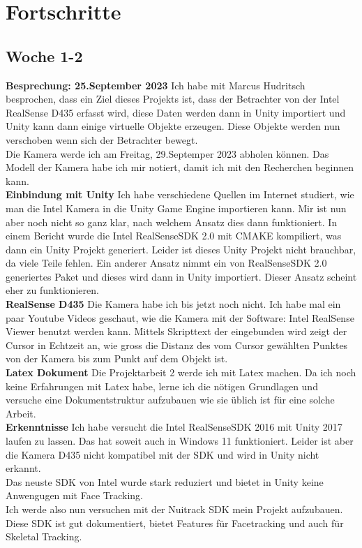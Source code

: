 \section{Fortschritte}
\subsection{Woche 1-2}
\textbf{Besprechung: 25.September 2023}
Ich habe mit Marcus Hudritsch besprochen, dass ein Ziel dieses Projekts ist, dass der Betrachter von der Intel RealSense D435 erfasst wird, diese Daten werden dann in Unity importiert und Unity kann dann einige virtuelle Objekte erzeugen. Diese Objekte werden nun verschoben wenn sich der Betrachter bewegt.\\
Die Kamera werde ich am Freitag, 29.Septemper 2023 abholen k\"onnen. Das Modell der Kamera habe ich mir notiert, damit ich mit den Recherchen beginnen kann.\\
\textbf{Einbindung mit Unity}
Ich habe verschiedene Quellen im Internet studiert, wie man die Intel Kamera in die Unity Game Engine importieren kann. Mir ist nun aber noch nicht so ganz klar, nach welchem Ansatz dies dann funktioniert. In einem Bericht wurde die Intel RealSenseSDK 2.0 mit CMAKE kompiliert, was dann ein Unity Projekt generiert. Leider ist dieses Unity Projekt nicht brauchbar, da viele Teile fehlen. Ein anderer Ansatz nimmt ein von RealSenseSDK 2.0 generiertes Paket und dieses wird dann in Unity importiert. Dieser Ansatz scheint eher zu funktionieren.\\
\textbf{RealSense D435} 
Die Kamera habe ich bis jetzt noch nicht. Ich habe mal ein paar Youtube Videos geschaut, wie die Kamera mit der Software: Intel RealSense Viewer benutzt werden kann. Mittels Skripttext der eingebunden wird zeigt der Cursor in Echtzeit an, wie gross die Distanz des vom Cursor gew\"ahlten Punktes von der Kamera bis zum Punkt auf dem Objekt ist. \\
\textbf{Latex Dokument}
Die Projektarbeit 2 werde ich mit Latex machen. Da ich noch keine Erfahrungen mit Latex habe, lerne ich die n\"otigen Grundlagen und versuche eine Dokumentstruktur aufzubauen wie sie \"ublich ist f\"ur eine solche Arbeit.\\ \textbf{Erkenntnisse}
Ich habe versucht die Intel RealSenseSDK 2016 mit Unity 2017 laufen zu lassen. Das hat soweit auch in Windows 11 funktioniert. Leider ist aber die Kamera D435 nicht kompatibel mit der SDK und wird in Unity nicht erkannt. \\ Das neuste SDK von Intel wurde stark reduziert und bietet in Unity keine Anwengugen mit Face Tracking. \\ Ich werde also nun versuchen mit der Nuitrack SDK mein Projekt aufzubauen. Diese SDK ist gut dokumentiert, bietet Features für Facetracking und auch für Skeletal Tracking.

